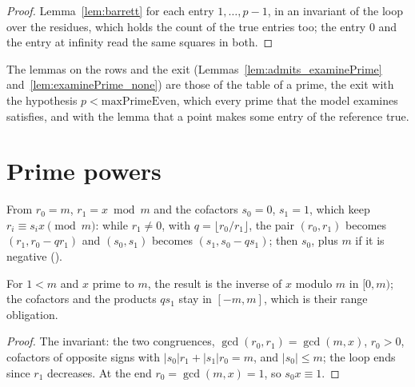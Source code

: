 \begin{proof}
  \leanok
  Lemma~\ref{lem:barrett} for each entry $1, \dots, p - 1$, in an invariant of the loop over the
  residues, which holds the count of the true entries too; the entry $0$ and the entry at infinity
  read the same squares in both.
\end{proof}

The lemmas on the rows and the exit (Lemmas~\ref{lem:admits_examinePrime}
and~\ref{lem:examinePrime_none}) are those of the table of a prime, the exit with the hypothesis
$p < \mathrm{maxPrimeEven}$, which every prime that the model examines satisfies, and with the lemma
that a point makes some entry of the reference true.

\section{Prime powers}\label{sec:powers}

\begin{definition}\label{def:modinv}
  \leanok
  From $r_0 = m$, $r_1 = x \bmod m$ and the cofactors $s_0 = 0$, $s_1 = 1$, which keep
  $r_i \equiv s_i x \pmod m$: while $r_1 \ne 0$, with $q = \lfloor r_0 / r_1 \rfloor$, the pair
  $(r_0, r_1)$ becomes $(r_1, r_0 - q r_1)$ and $(s_0, s_1)$ becomes $(s_1, s_0 - q s_1)$; then
  $s_0$, plus $m$ if it is negative ().
\end{definition}

\begin{lemma}\label{lem:modinv}
  \leanok
  For $1 < m$ and $x$ prime to $m$, the result is the inverse of $x$ modulo $m$ in $[0, m)$; the
  cofactors and the products
  $q s_1$ stay in $[-m, m]$, which is their range obligation.
\end{lemma}

\begin{proof}
  \leanok
  The invariant: the two congruences, $\gcd(r_0, r_1) = \gcd(m, x)$, $r_0 > 0$, cofactors of
  opposite signs with $|s_0| r_1 + |s_1| r_0 = m$, and $|s_0| \le m$; the loop ends since $r_1$
  decreases. At the end $r_0 = \gcd(m, x) = 1$, so $s_0 x \equiv 1$.
\end{proof}

